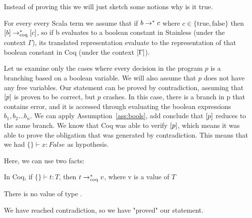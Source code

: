 Instead of proving this we will just sketch some notions why is it true.

\begin{assumption}
	\label{ass:bools}
	For every every Scala term  we assume that if $b \rightarrow^{*} c$ where $c \in \{\text{true}, \text{false}\}$ then $[b] \rightarrow^{*}_{\text{coq}} [c]$, so if b evaluates to a boolean constant in Stainless (under the context $\Gamma$), its translated representation evaluate to the representation of that boolean constant in Coq (under the context $[\Gamma]$).
\end{assumption}

Let us examine only the cases where every decision in the program $p$ is a branching based on a boolean variable. We will also assume that $p$ does not have any free variables. 
Our statement can be proved by contradiction, assuming that $[p]$ is proven to be correct, but $p$ crashes. In this case, there is a branch in p that contains error, and it is accessed through evaluating the boolean expressions $b_1, b_2 \ldots b_n$. We can apply Assumption~\ref{ass:bools}, add conclude that $[p]$ reduces to the same branch. We know that Coq was able to verify $[p]$, which means it was able to prove the obligation that was generated by contradiction. This means that we had $\{\} \vdash x: False$ as hypothesis.

Here, we can use two facts:

\begin{fact}
	In Coq, if $\{\} \vdash t: T$, then $t \rightarrow^{*}_{\text{coq}} v$, where v is a value of $T$
\end{fact}
\begin{fact}
	There is no value of type .
\end{fact}

We have reached contradiction, so we have "proved" our statement.


